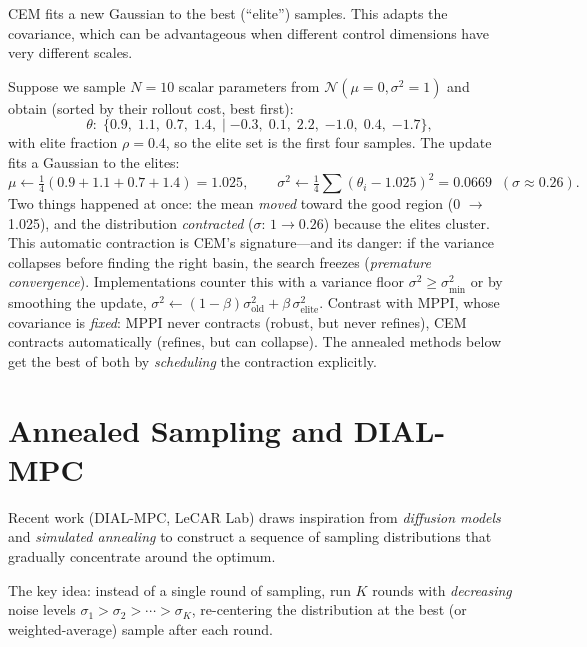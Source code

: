 \documentclass[11pt,twoside]{report}
\theoremstyle{definition}
\theoremstyle{plain}
\theoremstyle{remark}
\newcommand{\0}{\bm{0}}
\begin{document}
CEM fits a new Gaussian to the best (``elite'') samples.
This adapts the covariance, which can be advantageous when different
control dimensions have very different scales.

\begin{examplebox}
Suppose we sample $N=10$ scalar parameters from
$\mathcal{N}(\mu=0,\sigma^{2}=1)$ and obtain (sorted by their rollout
cost, best first):
\begin{equation*}
\theta:\;\{0.9,\;1.1,\;0.7,\;1.4,\;|\;{-0.3},\;0.1,\;2.2,\;{-1.0},\;0.4,\;{-1.7}\},
\end{equation*}
with elite fraction $\rho=0.4$, so the elite set is the first four
samples. The update fits a Gaussian to the elites:
\begin{equation*}
\mu\leftarrow\tfrac14(0.9+1.1+0.7+1.4)=1.025,\qquad
\sigma^{2}\leftarrow\tfrac14\textstyle\sum(\theta_{i}-1.025)^{2}=0.0669
\;\;(\sigma\approx 0.26).
\end{equation*}
Two things happened at once: the mean \emph{moved} toward the
good region (0 $\to$ 1.025), and the distribution \emph{contracted}
($\sigma$: $1\to 0.26$) because the elites cluster.
This automatic contraction is CEM's signature---and its danger:
if the variance collapses before finding the right basin, the search
freezes (\emph{premature convergence}). Implementations counter this
with a variance floor $\sigma^{2}\ge\sigma_{\min}^{2}$ or by smoothing
the update, $\sigma^{2}\leftarrow(1-\beta)\sigma_{\text{old}}^{2}
+\beta\,\sigma_{\text{elite}}^{2}$.
Contrast with MPPI, whose covariance is \emph{fixed}: MPPI never
contracts (robust, but never refines), CEM contracts automatically
(refines, but can collapse). The annealed methods below get the best of
both by \emph{scheduling} the contraction explicitly.
\end{examplebox}

\section{Annealed Sampling and DIAL-MPC}
\label{sec:dial-mpc}

Recent work (DIAL-MPC, LeCAR Lab) draws inspiration from
\emph{diffusion models} and \emph{simulated annealing} to construct
a sequence of sampling distributions that gradually concentrate
around the optimum.

The key idea: instead of a single round of sampling,
run $K$ rounds with \emph{decreasing} noise levels
$\sigma_{1}>\sigma_{2}>\cdots>\sigma_{K}$, re-centering the
distribution at the best (or weighted-average) sample after each round.
\end{document}

